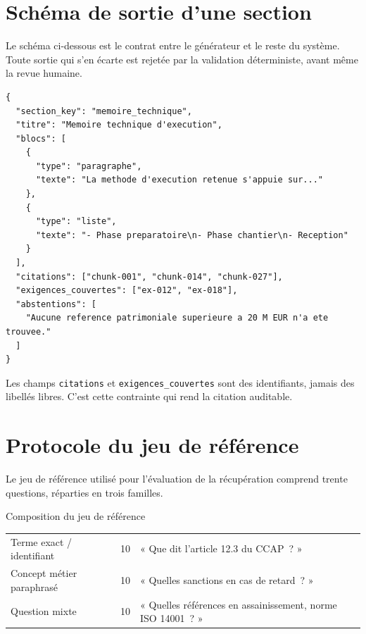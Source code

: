 \chapter{Schéma de sortie d'une section}
\label{annexe:schema}

Le schéma ci-dessous est le contrat entre le générateur et le reste du
système. Toute sortie qui s'en écarte est rejetée par la validation
déterministe, avant même la revue humaine.

\begin{lstlisting}[style=btpjson, caption={Contrat JSON d'une section générée}]
{
  "section_key": "memoire_technique",
  "titre": "Memoire technique d'execution",
  "blocs": [
    {
      "type": "paragraphe",
      "texte": "La methode d'execution retenue s'appuie sur..."
    },
    {
      "type": "liste",
      "texte": "- Phase preparatoire\n- Phase chantier\n- Reception"
    }
  ],
  "citations": ["chunk-001", "chunk-014", "chunk-027"],
  "exigences_couvertes": ["ex-012", "ex-018"],
  "abstentions": [
    "Aucune reference patrimoniale superieure a 20 M EUR n'a ete trouvee."
  ]
}
\end{lstlisting}

Les champs \texttt{citations} et \texttt{exigences\_couvertes} sont des
identifiants, jamais des libellés libres. C'est cette contrainte qui rend
la citation auditable.

\chapter{Protocole du jeu de référence}
\label{annexe:golden}

Le jeu de référence utilisé pour l'évaluation de la récupération
comprend trente questions, réparties en trois familles.

\begin{btptable}{Composition du jeu de référence}
\begin{tabularx}{\linewidth}{@{}L{4.2cm} C{2.2cm} Y@{}}
\toprule
{}
 &  &  \\
\midrule
Terme exact / identifiant & 10 & « Que dit l'article 12.3 du CCAP~? » \\
Concept métier paraphrasé & 10 & « Quelles sanctions en cas de retard~? » \\
Question mixte            & 10 & « Quelles références en assainissement, norme ISO 14001~? » \\
\bottomrule
\end{tabularx}
\end{btptable}

